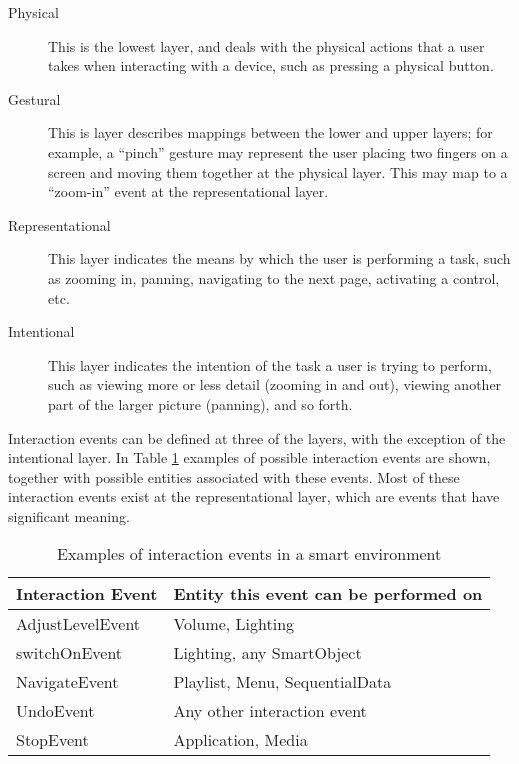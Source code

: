 \begin{description}
\item [Physical] This is the lowest layer, and deals with the physical actions that a user takes when interacting with a device, such as pressing a physical button.
\item [Gestural] This is layer describes mappings between the lower and upper layers; for example, a ``pinch'' gesture may represent the user placing two fingers on a screen and moving them together at the physical layer. This may map to a ``zoom-in'' event at the representational layer.
\item [Representational] This layer indicates the means by which the user is performing a task, such as zooming in, panning, navigating to the next page, activating a control, etc.
\item [Intentional] This layer indicates the intention of the task a user is trying to perform, such as viewing more or less detail (zooming in and out), viewing another part of the larger picture (panning), and so forth.
\end{description}

Interaction events can be defined at three of the layers, with the exception of the intentional layer. In Table \ref{transformationTable} examples of possible interaction events are shown, together with possible entities associated with these events. Most of these interaction events exist at the representational layer, which are events that have significant meaning.

\begin{table}
\centering
\begin{tabular}{|l|l|}
\hline
Interaction Event & Entity this event can be performed on\\
\hline
AdjustLevelEvent & Volume, Lighting \\
switchOnEvent & Lighting, any SmartObject \\
NavigateEvent & Playlist, Menu, SequentialData \\
UndoEvent & Any other interaction event \\
StopEvent & Application, Media \\
\hline
\end{tabular}
\caption{Examples of interaction events in a smart environment}
\label{transformationTable}
\end{table}



